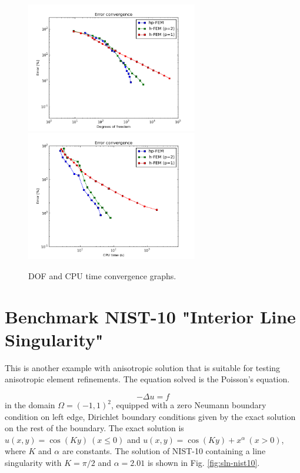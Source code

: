 \documentclass[12pt]{elsarticle}
\begin{document}
\begin{figure}[H]
\centering
\hspace{-50mm}
\includegraphics[width=7.5cm]{nist/nist-9/conv_dof_aniso.png}\ \
\hspace{-10mm}
\includegraphics[width=7.5cm]{nist/nist-9/conv_cpu_aniso.png}
\hspace{-50mm}
\caption{DOF and CPU time convergence graphs.}
\label{fig:nist-9-conv}
\end{figure}


\section{Benchmark NIST-10 "Interior Line Singularity"}
\label{sec:bench-10}

This is another example with anisotropic solution that is suitable for testing
anisotropic element refinements. The equation solved is the Poisson's equation.

\begin{equation} \label{interior}
-\Delta u = f
\end{equation}
in the domain $\Omega = (-1, 1)^2$, equipped with a zero
Neumann boundary condition on left edge, Dirichlet boundary
conditions given by the exact solution on the rest of the boundary.
The exact solution is
$u(x,y) = \cos(Ky)\ (x \le 0)$ and $u(x,y) = \cos(Ky) + x^{\alpha}\ (x > 0)$,
where $K$ and $\alpha$ are constants.
The solution of NIST-10 containing a line singularity with $K = \pi/2$ and
$\alpha = 2.01$ is shown in Fig. \ref{fig:sln-nist10}.
\end{document}
